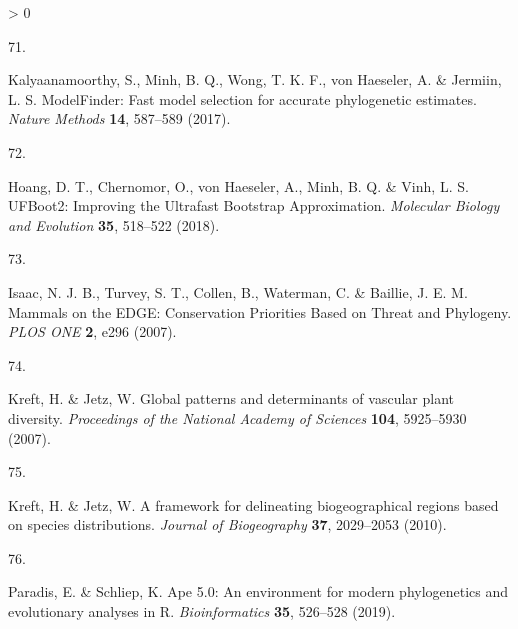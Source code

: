 \documentclass[10pt,oneside]{article}
\newlength{\cslhangindent}
\newlength{\csllabelwidth}
\newenvironment{CSLReferences}[3] %
 {%
  \setlength{\parindent}{0pt}
  \ifodd #1 \everypar{\setlength{\hangindent}{\cslhangindent}}\ignorespaces\fi
  \ifnum #2 > 0
  \setlength{\parskip}{#2\baselineskip}
  \fi
 }%
 {}
\newcommand{\CSLLeftMargin}[1]{\parbox[t]{\maxof{\widthof{#1}}{\csllabelwidth}}{#1}}
\newcommand{\CSLRightInline}[1]{\parbox[t]{\linewidth}{#1}}
\begin{document}
\begin{CSLReferences}{0}{0}
\leavevmode\hypertarget{ref-Kalyaanamoorthy2017Modelfinder}{}%
\CSLLeftMargin{71. }
\CSLRightInline{Kalyaanamoorthy, S., Minh, B. Q., Wong, T. K. F., von
Haeseler, A. \& Jermiin, L. S. ModelFinder: Fast model selection for
accurate phylogenetic estimates. \emph{Nature Methods} \textbf{14},
587--589 (2017).}

\leavevmode\hypertarget{ref-Hoang2018Ufboot2}{}%
\CSLLeftMargin{72. }
\CSLRightInline{Hoang, D. T., Chernomor, O., von Haeseler, A., Minh, B.
Q. \& Vinh, L. S. UFBoot2: Improving the Ultrafast Bootstrap
Approximation. \emph{Molecular Biology and Evolution} \textbf{35},
518--522 (2018).}

\leavevmode\hypertarget{ref-Isaac2007Mammals}{}%
\CSLLeftMargin{73. }
\CSLRightInline{Isaac, N. J. B., Turvey, S. T., Collen, B., Waterman, C.
\& Baillie, J. E. M. Mammals on the EDGE: Conservation Priorities Based
on Threat and Phylogeny. \emph{PLOS ONE} \textbf{2}, e296 (2007).}

\leavevmode\hypertarget{ref-Kreft2007Global}{}%
\CSLLeftMargin{74. }
\CSLRightInline{Kreft, H. \& Jetz, W. Global patterns and determinants
of vascular plant diversity. \emph{Proceedings of the National Academy
of Sciences} \textbf{104}, 5925--5930 (2007).}

\leavevmode\hypertarget{ref-Kreft2010Framework}{}%
\CSLLeftMargin{75. }
\CSLRightInline{Kreft, H. \& Jetz, W. A framework for delineating
biogeographical regions based on species distributions. \emph{Journal of
Biogeography} \textbf{37}, 2029--2053 (2010).}

\leavevmode\hypertarget{ref-Paradis2019Ape}{}%
\CSLLeftMargin{76. }
\CSLRightInline{Paradis, E. \& Schliep, K. Ape 5.0: An environment for
modern phylogenetics and evolutionary analyses in R.
\emph{Bioinformatics} \textbf{35}, 526--528 (2019).}

\end{CSLReferences}
\end{document}
